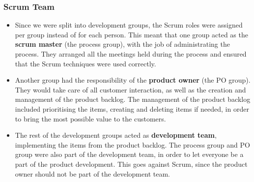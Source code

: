 \subsubsection{Scrum Team}
\begin{itemize}
\item Since we were split into development groups, the Scrum roles were assigned per group instead of for each person.
This meant that one group acted as the \textbf{scrum master} (the process group), with the job of administrating the process. They arranged all the meetings held during the process and ensured that the Scrum techniques were used correctly. 

\item Another group had the responsibility of the \textbf{product owner} (the PO group). They would take care of all customer interaction, as well as the creation and management of the product backlog. The management of the product backlog included prioritising the items, creating and deleting items if needed, in order to bring the most possible value to the customers. 

\item The rest of the development groups acted as \textbf{development team}, implementing the items from the product backlog. 
The process group and PO group were also part of the development team, in order to let everyone be a part of the product development. This goes against Scrum, since the product owner should not be part of the development team.
\end{itemize}

